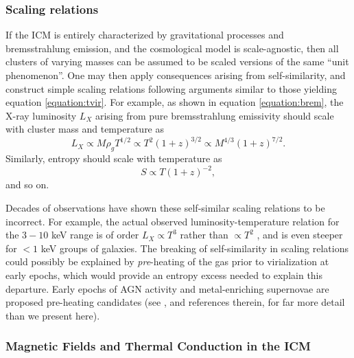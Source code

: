 \subsubsection{{\bf Scaling relations}}



If the ICM is entirely characterized by gravitational processes and bremsstrahlung emission, 
and the cosmological model is scale-agnostic, then all clusters of varying masses can be 
assumed to be scaled versions of the same ``unit phenomenon''.
One may then apply consequences arising from self-similarity, and 
construct simple scaling relations following arguments similar to those yielding equation \ref{equation:tvir}. 
For example, 
as shown in equation \ref{equation:brem}, the X-ray luminosity $L_X$ arising from pure bremsstrahlung emissivity should scale with 
cluster mass and temperature as 
\begin{equation}
L_X \propto M \rho_g T^{1/2} \propto T^2 \left(1+z\right)^{3/2} \propto M^{4/3} \left(1+z\right)^{7/2}.
\end{equation}
Similarly, entropy should scale with temperature as 
\begin{equation}
S \propto T\left(1+z\right)^{-2},
\end{equation}
and so on. 


Decades of observations have shown these self-similar scaling relations to be incorrect. 
For example, the actual observed luminosity-temperature relation for the $3-10$ keV range is of order 
$L_X \propto T^{3}$ rather than $\propto T^2$  \citep{markevitch98,arnaud99}, and is even steeper for $<1$ keV groups of galaxies.
 The breaking of self-similarity in scaling relations 
could possibly be explained by {\it pre}-heating of the gas prior to virialization at early epochs, which would provide an 
entropy excess needed to explain this departure.  
Early epochs of AGN activity and metal-enriching supernovae are proposed pre-heating candidates (see \citealt{rosati02,voit05}, and references therein, for far more 
detail than we present here).  


\subsubsection{{\bf Magnetic Fields and Thermal Conduction in the ICM}}

\label{section:magneticfields}

